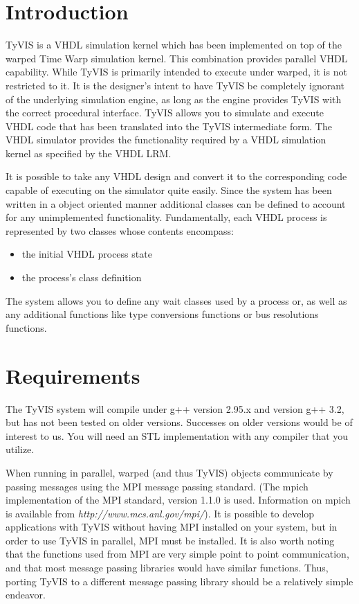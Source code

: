 \documentclass[11pt]{article}
\begin{document}
\section{Introduction}

TyVIS is a VHDL simulation kernel which has been implemented on top of
the {\sc warped} Time Warp simulation kernel.  This combination
provides parallel VHDL capability.  While TyVIS is primarily intended to
execute under {\sc warped}, it is not restricted to it.  It is the
designer's intent to have TyVIS be completely ignorant of the underlying
simulation engine, as long as the engine provides TyVIS with the correct
procedural interface.  TyVIS allows you to simulate and execute VHDL
code that has been translated into the TyVIS \Cpp\/ intermediate form.  The
VHDL simulator provides the functionality required by a VHDL simulation
kernel as specified by the VHDL LRM. 

It is possible to take any VHDL design and convert it to the
corresponding \Cpp\/ code capable of executing on the simulator quite
easily.  Since the system has been written in a object oriented manner
additional classes can be defined to account for any unimplemented
functionality.  Fundamentally, each VHDL process is represented by two
\Cpp\/ classes whose contents encompass: 

\begin{itemize}
\item the initial VHDL process state
\item the process's \Cpp\/ class definition 
\end{itemize}
        
The system allows you to define any wait classes used by a process or,
as well as any additional functions like type conversions functions or
bus resolutions functions. 

\section{Requirements}

The TyVIS system will compile under g++ version 2.95.x and version g++ 3.2,
but has not been tested on older versions.  Successes on older versions
would be of interest to us.  You will need an STL implementation with any
compiler that you utilize.

When running in parallel, {\sc warped} (and thus TyVIS) objects communicate
by passing messages using the MPI message passing standard.  (The {\sc
mpich} implementation of the MPI standard, version 1.1.0 is used.
Information on {\sc mpich} is available from {\it
http://www.mcs.anl.gov/mpi/}).  It is possible to develop applications with
TyVIS without having MPI installed on your system, but in order to use
TyVIS in parallel, MPI must be installed.  It is also worth noting that the
functions used from MPI are very simple point to point communication, and
that most message passing libraries would have similar functions.  Thus,
porting TyVIS to a different message passing library should be a relatively
simple endeavor.
\end{document}
